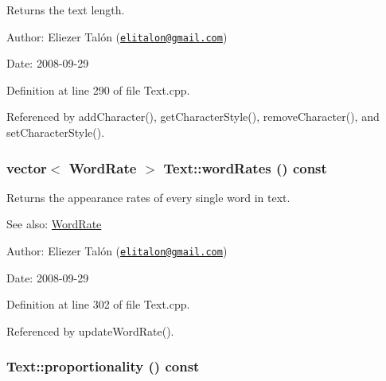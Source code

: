 Returns the text length. 

\begin{Desc}
\item[Author:]Eliezer Talón (\href{mailto:elitalon@gmail.com}{\tt elitalon@gmail.com}) \end{Desc}
\begin{Desc}
\item[Date:]2008-09-29 \end{Desc}


Definition at line 290 of file Text.cpp.

Referenced by addCharacter(), getCharacterStyle(), removeCharacter(), and setCharacterStyle().\hypertarget{class_text_1c69ff1b2a6b1bfbf0b44fc4a185de3d}{
\subsubsection[wordRates]{\setlength{\rightskip}{0pt plus 5cm}vector$<$ {\bf WordRate} $>$ Text::wordRates () const}}
\label{class_text_1c69ff1b2a6b1bfbf0b44fc4a185de3d}


Returns the appearance rates of every single word in text. 

\begin{Desc}
\item[See also:]\hyperlink{_word_rate_8h_e8f43926daba5798edbb3cb94ad07ff7}{WordRate}\end{Desc}
\begin{Desc}
\item[Author:]Eliezer Talón (\href{mailto:elitalon@gmail.com}{\tt elitalon@gmail.com}) \end{Desc}
\begin{Desc}
\item[Date:]2008-09-29 \end{Desc}


Definition at line 302 of file Text.cpp.

Referenced by updateWordRate().\hypertarget{class_text_28df8a28b99fc925f6a9597a81769f62}{
\subsubsection[proportionality]{ Text::proportionality () const}}
\label{class_text_28df8a28b99fc925f6a9597a81769f62}


